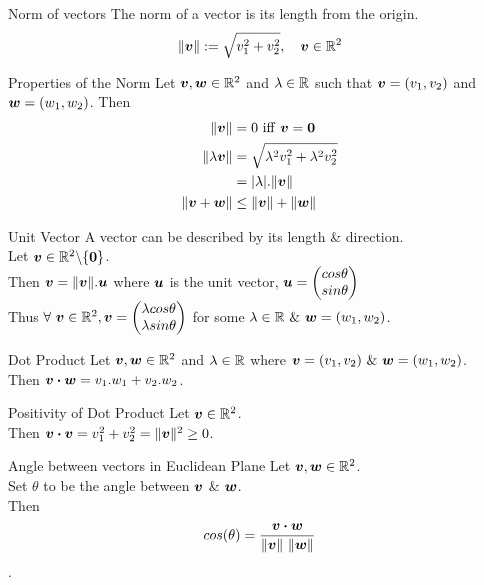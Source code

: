 \documentclass[11pt,a4paper]{article}
\begin{document}
\subtitle{Definition 1.04 - }{Norm of vectors}
The norm of a vector is its length from the origin. \\
$$\|\boldsymbol{v}\| := \sqrt{v_{1}^{2} + v_{2}^{2}}, \quad \boldsymbol{v} \in \mathbb{R}^2$$

\subtitle{Theorem 1.05 - }{Properties of the Norm}
Let $\boldsymbol{v}, \boldsymbol{w} \in \mathbb{R}^2$ and $\lambda \in \mathbb{R} $ such that $\boldsymbol{v} = (v_1,v_2)$ and $\boldsymbol{w} = (w_1,w_2)$. Then
\begin{align*}
  \|\boldsymbol{v}\| &= 0\ \mathrm{iff}\ \boldsymbol{v} = \boldsymbol{0}\\
  \|\lambda\boldsymbol{v}\| &= \sqrt{\lambda^2v_{1}^{2} + \lambda^2v_{2}^{2}} \\
  &= |\lambda|.\|\boldsymbol{v}\| \\
  \|\boldsymbol{v} + \boldsymbol{w}\| &\leq \|\boldsymbol{v}\| + \|\boldsymbol{w}\|
\end{align*}

\subtitle{Definition 1.06 - }{Unit Vector}
A vector can be described by its length \& direction. \\
Let $\boldsymbol{v} \in \mathbb{R}^2\backslash\{\boldsymbol{0}\}$. \\
Then $\boldsymbol{v} = \|\boldsymbol{v}\|.\boldsymbol{u}$ where $\boldsymbol{u}$ is the unit vector, $\boldsymbol{u} = \begin{pmatrix} cos\theta \\ sin\theta \end{pmatrix}$ \\
Thus $\forall\ \boldsymbol{v} \in \mathbb{R}^2, \boldsymbol{v} = \begin{pmatrix} \lambda cos\theta \\ \lambda sin\theta \end{pmatrix}$ for some $\lambda \in \mathbb{R}\ \&\ \boldsymbol{w} = (w_1, w_2)$. \\

\subtitle{Definition 1.07 - }{Dot Product}
Let $\boldsymbol{v}, \boldsymbol{w} \in \mathbb{R}^2$ and $\lambda \in \mathbb{R}$ where $\vect{v} = (v_1,v_2)\ \&\ \vect{w} = (w_1, w_2)$. \\
Then $\boldsymbol{v} \boldsymbol{\cdot} \boldsymbol{w} = v_1.w_1 + v_2.w_2$. \\

\subtitle{Remark 1.08 - }{Positivity of Dot Product}
Let $\boldsymbol{v} \in \mathbb{R}^2$. \\
Then $\boldsymbol{v} \boldsymbol{\cdot} \boldsymbol{v} = v_{1}^{2} + v_{2}^{2} = \|\boldsymbol{v}\|^2 \geq 0$. \\

\subtitle{Remark 1.09 - }{Angle between vectors in Euclidean Plane}
Let $\boldsymbol{v}, \boldsymbol{w} \in \mathbb{R}^2$. \\
Set $\theta$ to be the angle between $\boldsymbol{v}$ \& $\boldsymbol{w}$. \\
Then
$$cos(\theta) = \frac{\boldsymbol{v} \boldsymbol{\cdot} \boldsymbol{w}}{\|\boldsymbol{v}\|\ \|\boldsymbol{w}\|}$$.
\end{document}
